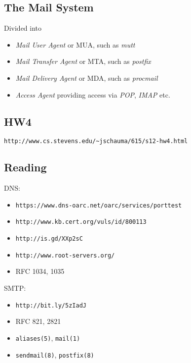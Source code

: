 \documentclass[xga]{xdvislides}
\begin{document}
\subsection{The Mail System}
Divided into
\begin{itemize}
	\item {\em Mail User Agent} or MUA, such as {\em mutt}
	\item {\em Mail Transfer Agent} or MTA, such as {\em postfix}
	\item {\em Mail Delivery Agent} or MDA, such as {\em procmail}
	\item {\em Access Agent} providing access via {\em POP}, {\em IMAP} etc.
\end{itemize}

\subsection{HW4}
\verb+http://www.cs.stevens.edu/~jschauma/615/s12-hw4.html+

\subsection{Reading}
DNS:
\begin{itemize}
	\item \verb+https://www.dns-oarc.net/oarc/services/porttest+
	\item \verb+http://www.kb.cert.org/vuls/id/800113+
	\item \verb+http://is.gd/XXp2sC+
	\item \verb+http://www.root-servers.org/+
	\item RFC 1034, 1035
\end{itemize}
\addvspace{.5in}

SMTP:
\begin{itemize}
	\item \verb+http://bit.ly/5zIadJ+
	\item RFC 821, 2821
	\item \verb+aliases(5)+, \verb+mail(1)+
	\item \verb+sendmail(8)+, \verb+postfix(8)+
\end{itemize}
\end{document}
